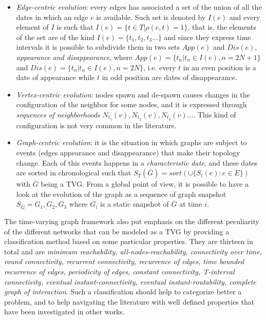 	\begin{itemize}
		\item \textit{Edge-centric evolution}: every edges has associated a set of the union of all the dates in which an edge \(e\) is available. Such set is denoted by \(I(e)\) and every element of \(I\) is such that \(I(e) = \{t \in T | \rho(e,t) = 1\}\), that is, the elements of the set are of the kind \(I(e) = \{t_1, t_2, t_3 ... \}\) and since they express time intervals it is possible to subdivide them in two sets \(App(e)\) and \(Dis(e)\), \textit{appearance and disappearance}, where \(App(e) = \{t_n | t_n \in I(e), n = 2N + 1\}\) and \(Dis(e) = \{t_n | t_n \in I(e), n = 2N\}\), i.e. every \(t\) in an even position is a date of appearance while \(t\) in odd position are dates of disappearance.
		
		\item \textit{Vertex-centric evolution}: nodes spawn and de-spawn causes changes in the configuration of the neighbor for some nodes, and it is expressed through \textit{sequences of neighborhoods} \(N_{t_1}(v), N_{t_2}(v), N_{t_3}(v) ...\). This kind of configuration is not very common in the literature.
		
		\item \textit{Graph-centric evolution}: it is the situation in which graphs are subject to events (edges appearance and disappearance) that make their topology change. Each of this events happens in a \textit{characteristic date}, and these dates are sorted in chronological such that \(S_{T}(\overline{G}) = sort(\cup\{S_t(e) : e \in E\})\) with \( \overline{G}\) being a TVG. From a global point of view, it is possible to have a look at the evolution of the graph as a sequence of graph snapshot \(S_{\overline{G}} = G_1, G_2, G_3\) where \(G_i\) is a static snapshot of \(\overline{G}\) at time \(i\).
	\end{itemize}
	
	The time-varying graph framework also put emphasis on the different peculiarity of the different networks that can be modeled as a TVG by providing a classification method based on some particular properties. They are thirteen in total and are \textit{minimum reachability, all-nodes-reachability, connectivity over time, round connectivity, recurrent connectivity, recurrence of edges, time bounded recurrence of edges, periodicity of edges, constant connectivity, T-interval connectivity, eventual instant-connectivity, eventual instant-routability, complete graph of interaction}.
	Such a classification should help to categorize better a problem, and to help navigating the literature with well defined properties that have been investigated in other works.
